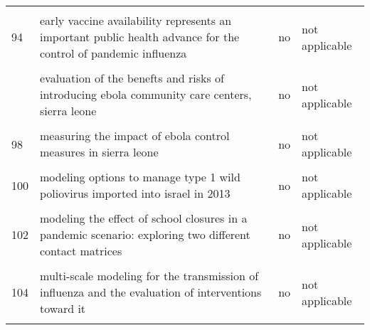 \documentclass[
]{article}
\begin{document}
\begin{landscape}
\begin{longtable}{l>{\raggedright\arraybackslash}p{4cm}l>{\raggedright\arraybackslash}p{4cm}}
\cellcolor{gray!6}{93} & \cellcolor{gray!6}{dynamic simulation of a seiqr-v epidemic model based on cellular automata} & \cellcolor{gray!6}{yes} & \cellcolor{gray!6}{inconclusive}\\
94 & early vaccine availability represents an important public health advance for the control of pandemic influenza & no & not applicable\\
\cellcolor{gray!6}{95} & \cellcolor{gray!6}{effectiveness of ebola treatment units and community care centers — liberia, september 23–october 31, 2014} & \cellcolor{gray!6}{no} & \cellcolor{gray!6}{not applicable}\\
\addlinespace
96 & evaluation of the benefts and risks of introducing ebola community care centers, sierra leone & no & not applicable\\
\cellcolor{gray!6}{97} & \cellcolor{gray!6}{evidence for emergency vaccination having played a crucial role to control the 1965/66 foot-and-mouth disease outbreak in switzerland} & \cellcolor{gray!6}{yes} & \cellcolor{gray!6}{yes}\\
98 & measuring the impact of ebola control measures in sierra leone & no & not applicable\\
\cellcolor{gray!6}{99} & \cellcolor{gray!6}{media impact switching surface during an infectious disease outbreak} & \cellcolor{gray!6}{no} & \cellcolor{gray!6}{not applicable}\\
100 & modeling options to manage type 1 wild poliovirus imported into israel in 2013 & no & not applicable\\
\addlinespace
\cellcolor{gray!6}{101} & \cellcolor{gray!6}{modeling the effect of comprehensive interventions on ebola virus transmission} & \cellcolor{gray!6}{no} & \cellcolor{gray!6}{not applicable}\\
102 & modeling the effect of school closures in a pandemic scenario: exploring two different contact matrices & no & not applicable\\
\cellcolor{gray!6}{103} & \cellcolor{gray!6}{modelling the effect of early detection of ebola} & \cellcolor{gray!6}{no} & \cellcolor{gray!6}{not applicable}\\
104 & multi-scale modeling for the transmission of influenza and the evaluation of interventions toward it & no & not applicable\\
\cellcolor{gray!6}{105} & \cellcolor{gray!6}{optimal intervention strategies for a seir control model of ebola epidemics} & \cellcolor{gray!6}{no} & \cellcolor{gray!6}{not applicable}\\

\end{longtable}
\end{landscape}
\end{document}

